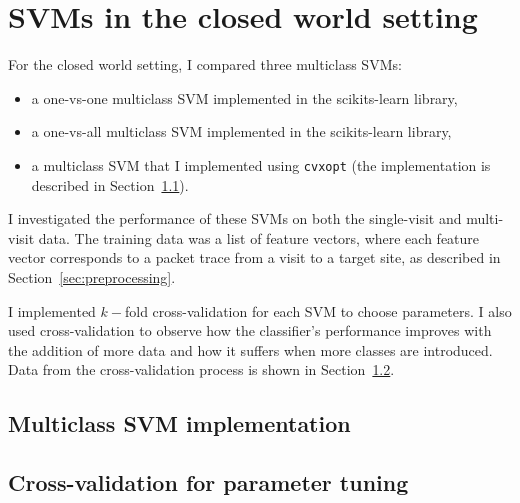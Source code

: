 \documentclass[10pt, twocolumn]{article}
\begin{document}
\section{SVMs in the closed world setting}

For the closed world setting, I compared three multiclass SVMs:
\begin{itemize}
\item a one-vs-one multiclass SVM implemented in the scikits-learn library,
\item a one-vs-all multiclass SVM implemented in the scikits-learn library,
\item a multiclass SVM that I implemented using \texttt{cvxopt} (the implementation is 
described in Section~\ref{sec:multiclassimplementation}).
\end{itemize}

I investigated the performance of these SVMs on both the single-visit and multi-visit data. 
The training data was a list of feature vectors, where each feature vector corresponds to a 
packet trace from a visit to a target site, as described in Section~\ref{sec:preprocessing}.

I implemented $k-$fold cross-validation for each SVM to choose parameters. I also used 
cross-validation to observe how the classifier's performance improves with the addition of more data 
and how it suffers when more classes are introduced. Data from the cross-validation process is shown 
in Section~\ref{sec:crossvalidation}.

\subsection{Multiclass SVM implementation}
\label{sec:multiclassimplementation}

\subsection{Cross-validation for parameter tuning}
\label{sec:crossvalidation}
\end{document}
